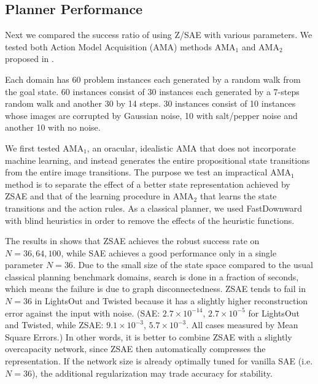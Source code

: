 
\subsection{Planner Performance}

Next we compared the success ratio of \latentplanner using Z/SAE with various parameters.
We tested both Action Model Acquisition (AMA) methods AMA$_1$ and AMA$_2$ proposed in \cite{Asai2018}.

Each domain has 60 problem instances each generated by a random walk from
the goal state. 60 instances consist of 30 instances each generated by a 7-steps random walk
and another 30 by 14 steps. 30 instances consist of 10 instances whose images are corrupted by Gaussian noise,
10 with salt/pepper noise and another 10 with no noise.

We first tested AMA$_1$, an oracular, idealistic AMA that does not incorporate machine learning,
and instead generates the entire propositional state transitions from the entire image transitions.
The purpose we test an impractical AMA$_1$ method is
to separate the effect of a better state representation achieved by ZSAE
and that of the learning procedure in AMA$_2$ that learns the state transitions and the action rules.
As a classical planner, we used FastDownward \cite{Helmert04} with blind heuristics in order to
remove the effects of the heuristic functions.

The results in  shows that ZSAE achieves the robust success rate on $N=36,64,100$,
while SAE achieves a good performance only in a single parameter $N=36$.
% 
Due to the small size of the state space compared to the usual classical planning benchmark domains,
search is done in a fraction of seconds, which means the failure is due to graph disconnectedness.
ZSAE tends to fail in $N=36$ in LightsOut and Twisted because it has a slightly higher reconstruction error
against the input with noise.
(SAE: $2.7\times 10^{-14}$, $2.7\times 10^{-5}$ for LightsOut and Twisted, while
ZSAE: $9.1\times 10^{-3}$, $5.7\times 10^{-3}$.
All cases measured by Mean Square Errors.)
In other words, it is better to combine ZSAE with a slightly overcapacity network,
since ZSAE then automatically compresses the representation.
If the network size is already optimally tuned for vanilla SAE (i.e. $N=36$),
the additional regularization may trade accuracy for stability.


